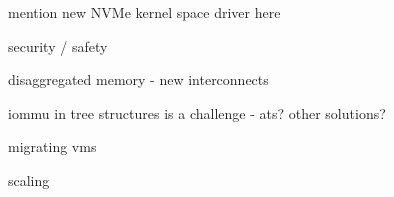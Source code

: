 %
%

mention new NVMe kernel space driver here

security / safety

disaggregated memory - new interconnects

iommu in tree structures is a challenge - ats? other solutions?

migrating vms

scaling 



%
%

